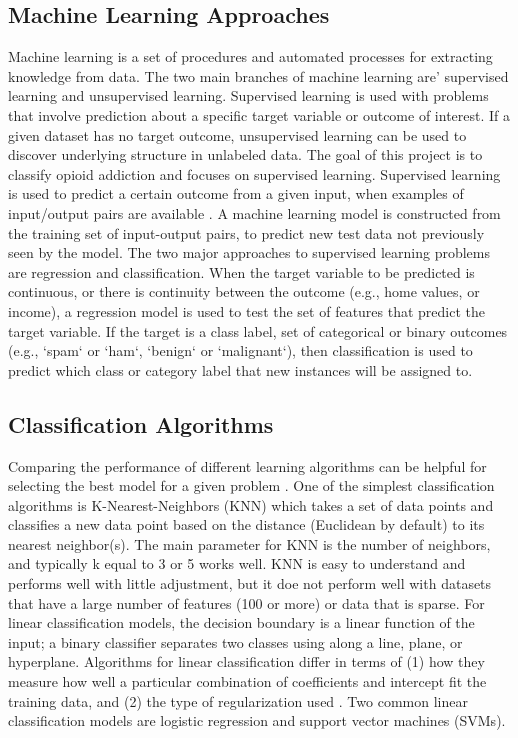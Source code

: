 \documentclass[sigconf]{acmart}
\begin{document}
\subsection{Machine Learning Approaches} 

Machine learning is a set of procedures and automated processes for extracting 
knowledge from data. The two main branches of machine learning are' supervised 
learning and unsupervised learning. Supervised learning is used with problems 
that involve prediction about a specific target variable or outcome of interest. 
If a given dataset has no target outcome, unsupervised learning can be used to 
discover underlying structure in unlabeled data. The goal of this project is 
to classify opioid addiction and focuses on supervised learning. Supervised 
learning is used to predict a certain outcome from a given input, when examples 
of input/output pairs are available \cite{muller17}. A machine learning model 
is constructed from the training set of input-output pairs, to predict new test 
data not previously seen by the model. The two major approaches to supervised 
learning problems are regression and classification. When the target variable 
to be predicted is continuous, or there is continuity between the outcome 
(e.g., home values, or income), a regression model is used to test the set of 
features that predict the target variable. If the target is a class label, set 
of categorical or binary outcomes (e.g., `spam` or `ham`, `benign` or 
`malignant`), then classification is used to predict which class or category 
label that new instances will be assigned to.

\subsection{Classification Algorithms} 
Comparing the performance of different learning algorithms can be helpful for 
selecting the best model for a given problem \cite{raschka17}. One of the 
simplest classification algorithms is K-Nearest-Neighbors (KNN) which takes a 
set of data points and classifies a new data point based on the distance 
(Euclidean by default) to its nearest neighbor(s). The main parameter for KNN
is the number of neighbors, and typically k equal to 3 or 5 works well. KNN is
easy to understand and performs well with little adjustment, but it doe not 
perform well with datasets that have a large number of features (100 or more) 
or data that is sparse. For linear classification models, the decision boundary 
is a linear function of the input; a binary classifier separates two classes 
using along a line, plane, or hyperplane. Algorithms for linear classification 
differ in terms of (1) how they measure how well a particular combination of 
coefficients and intercept fit the training data, and (2) the type of 
regularization used \cite{muller17}. Two common linear classification models 
are logistic regression and support vector machines (SVMs). 
\end{document}
